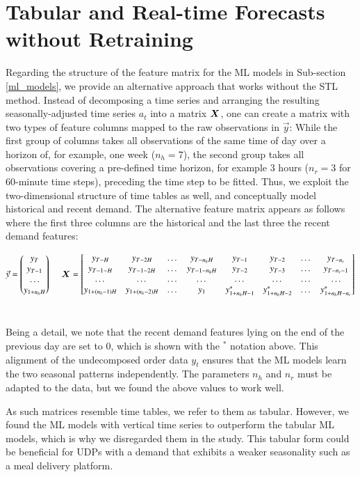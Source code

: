 \section{Tabular and Real-time Forecasts without Retraining}
\label{tabular_ml_models}

Regarding the structure of the feature matrix for the ML models in Sub-section
    \ref{ml_models}, we provide an alternative approach that works without
    the STL method.
Instead of decomposing a time series and arranging the resulting
    seasonally-adjusted time series $a_t$ into a matrix $\bm{X}$, one can
    create a matrix with two types of feature columns mapped to the raw
    observations in $\vec{y}$:
While the first group of columns takes all observations of the same time of
    day over a horizon of, for example, one week ($n_h=7$), the second group
    takes all observations covering a pre-defined time horizon, for example
    $3$ hours ($n_r=3$ for 60-minute time steps), preceding the time step to
    be fitted.
Thus, we exploit the two-dimensional structure of time tables as well, and
    conceptually model historical and recent demand.
The alternative feature matrix appears as follows where the first three
    columns are the historical and the last three the recent demand features:

$$
\vec{y}
=
\begin{pmatrix}
    y_T \\
    y_{T-1} \\
    \dots \\
    y_{1+n_hH}
\end{pmatrix}
~~~~~
\bm{X}
=
\begin{bmatrix}
    y_{T-H}              & y_{T-2H}       & \dots & y_{T-n_hH}
        & y_{T-1}        & y_{T-2}        & \dots & y_{T-n_r} \\
    y_{T-1-H}            & y_{T-1-2H}     & \dots & y_{T-1-n_hH}
        & y_{T-2}        & y_{T-3}        & \dots & y_{T-n_r-1} \\
    \dots                & \dots          & \dots & \dots
        & \dots          & \dots          & \dots & \dots \\
    y_{1+(n_h-1)H}       & y_{1+(n_h-2)H} & \dots & y_1
        & y^*_{1+n_hH-1} & y^*_{1+n_hH-2} & \dots & y^*_{1+n_hH-n_r}
\end{bmatrix}
$$
\

Being a detail, we note that the recent demand features lying on the end of
    the previous day are set to $0$, which is shown with the $^*$ notation
    above.
This alignment of the undecomposed order data $y_t$ ensures that the ML
    models learn the two seasonal patterns independently.
The parameters $n_h$ and $n_r$ must be adapted to the data, but we found the
    above values to work well.

As such matrices resemble time tables, we refer to them as tabular.
However, we found the ML models with vertical time series to outperform the
    tabular ML models, which is why we disregarded them in the study.
This tabular form could be beneficial for UDPs with a demand that exhibits
    a weaker seasonality such as a meal delivery platform.
